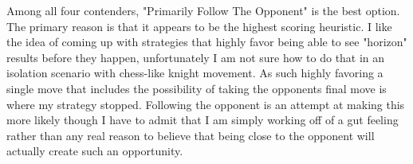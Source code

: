 \documentclass[10pt, a4paper]{article}
\begin{document}
Among all four contenders, "Primarily Follow The Opponent" is the best option.  The primary
reason is that it appears to be the highest scoring heuristic.  I like the idea of coming up
with strategies that highly favor being able to see "horizon" results before they happen, unfortunately
I am not sure how to do that in an isolation scenario with chess-like knight movement.  As such
highly favoring a single move that includes the possibility of taking the opponents final move
is where my strategy stopped.  Following the opponent is an attempt at making this more likely
though I have to admit that I am simply working off of a gut feeling rather than any real reason
to believe that being close to the opponent will actually create such an opportunity.
\end{document}
